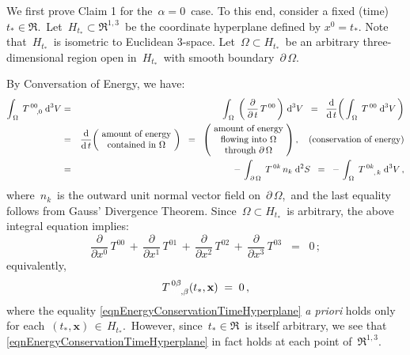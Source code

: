 \vskip 0.2cm
\noindent
We first prove Claim 1 for the \,$\alpha = 0$\, case.
To this end, consider a fixed (time) \,$ t_{*} \in \Re$.\,
Let \,$H_{t_{*}} \subset \Re^{1,3}$\, be the coordinate hyperplane defined by $x^{0} = t_{*}$.
Note that \,$H_{t_{*}}$\, is isometric to Euclidean $3$-space.
Let \,$\Omega \subset H_{t_{*}}$\, be an arbitrary three-dimensional region open in \,$H_{t_{*}}$\, 
with smooth boundary \,$\partial\,\Omega$.\,

\vskip 0.2cm
\noindent
By {\color{red}Conversation of Energy}, we have:
\begin{eqnarray*}
\int_{\,\Omega}\;T^{\,00}_{\,{\color{white}00},0}\;\d^{3}V
& = &
	\int_{\,\Omega}\;\left(\,\dfrac{\partial}{\partial\,t}\,T^{\,00}\,\right)\,\d^{3}V
\;\; = \;\;
	\dfrac{\d}{\d\,t}\!\left(\,\int_{\,\Omega}\;T^{\,00}\;\d^{3}V\,\right)
\\
&=&
\dfrac{\d}{\d\,t}\!\left(\!\begin{array}{c}
	\textnormal{amount of energy}
	\\
	\textnormal{contained in $\Omega$}
	\end{array}\!\right)
\;\; = \;\;
	\left(\!\begin{array}{c}
		\textnormal{amount of energy}
		\\
		\textnormal{flowing into $\Omega$}
		\\
		\textnormal{through $\partial\,\Omega$}
		\end{array}\!\right),
	\quad
	\textnormal{(conservation of energy)}
\\
&=&
	-\,\int_{\,\partial\,\Omega}\;T^{\,0k}\,n_{k}\;\d^{2}S
\;\; = \;\;
	-\,\int_{\,\Omega}\;T^{\,0k}_{\;{\color{white}0k},\,k}\;\d^{3}V\,,
\end{eqnarray*}
where \,$n_{k}$\, is the outward unit normal vector field on \,$\partial\,\Omega$,\,
and the last equality follows from {\color{red}Gauss' Divergence Theorem}.
Since \,$\Omega \subset H_{t_{*}}$\, is arbitrary, the above integral equation implies:
\begin{equation*}
\dfrac{\partial}{\partial x^{0}}\,T^{00}
\,+\,
\dfrac{\partial}{\partial x^{1}}\,T^{01}
\,+\,
\dfrac{\partial}{\partial x^{2}}\,T^{02}
\,+\,
\dfrac{\partial}{\partial x^{3}}\,T^{03}
\;\; = \;\;
0\,;
\end{equation*}
equivalently,
\begin{equation}\label{eqnEnergyConservationTimeHyperplane}
T^{\,0\beta}_{\;{\color{white}0\beta},\beta}(t_{*},\mathbf{x}) \; = \; 0\,,
\end{equation}
where the equality \eqref{eqnEnergyConservationTimeHyperplane}
\textit{a priori} holds only for each \,$(t_{*},\mathbf{x}) \,\in\, H_{t_{*}}$.\,
However, since \,$t_{*} \in \Re$\, is itself arbitrary, we see that 
\eqref{eqnEnergyConservationTimeHyperplane} in fact holds at each point of \,$\Re^{1,3}$.\,

